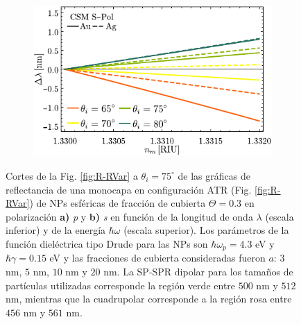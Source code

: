 \begin{figure}[h!]
	\begin{subfigure}{.45\linewidth}\centering
	\includegraphics[scale=1]{2-Resultados/figs/11-SPPCSM/6_Sens_h20_CSMS.pdf}\end{subfigure}\vspace*{-.5em}
	\caption{Cortes de la Fig. \ref{fig:R-RVar} a $\theta_i = 75^\circ$ de las gráficas de reflectancia de una monocapa en configuración ATR (Fig. \ref{fig:R-RVar}) de NPs esféricas de fracción de cubierta $\Theta = 0.3$ en polarización \textbf{a)} \emph{p} y \textbf{b)} \emph{s} en función de la longitud de onda $\lambda$ (escala inferior) y de la energía $\hbar\omega$ (escala superior). Los parámetros de la función dieléctrica tipo Drude para las NPs son $\hbar\omega_p = 4.3$ eV y $\hbar\gamma = 0.15$ eV y las fracciones de cubierta consideradas fueron $a$: $3$ nm, $5$ nm, $10$ nm y $20$ nm. La SP-SPR dipolar para los tamaños de partículas utilizadas corresponde la región verde entre $500$ nm y $512$ nm, mientras que la cuadrupolar corresponde a la región rosa entre $456$ nm y $561$ nm.}\label{fig:R-RVar-Cuts}
	\end{figure}	

























